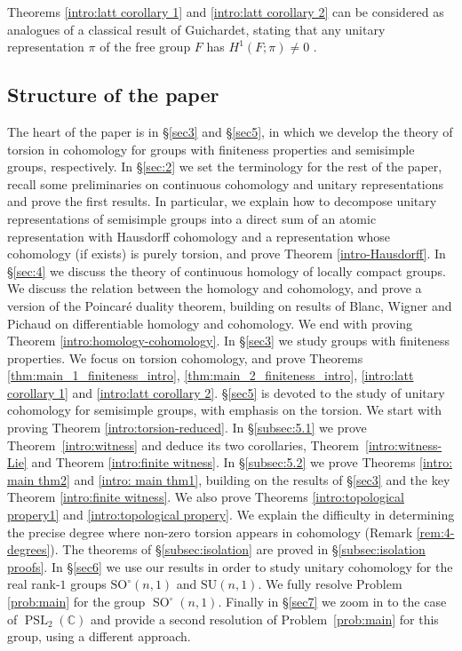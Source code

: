 \documentclass[12pt,reqno]{amsart}
\newcommand{\C}{\mathbb{C}}
\theoremstyle{definition}
\newcommand{\PSL}{\operatorname{PSL}}
\newcommand{\SO}{\operatorname{SO}}
\begin{document}
Theorems \ref{intro:latt corollary 1} and \ref{intro:latt corollary 2} can be considered as analogues of a classical result of Guichardet, stating that any unitary representation $\pi$ of the free group $F$ has $H^1(F;\pi) \neq 0$ \cite[Example~1]{Guichardet72}.



\subsection{Structure of the paper}
The heart of the paper is in \S\ref{sec3} and \S\ref{sec5}, in which we develop the theory of torsion in cohomology for groups with finiteness properties and semisimple groups, respectively. In \S\ref{sec:2} we set the terminology for the rest of the paper, recall some preliminaries on continuous cohomology and unitary representations and prove the first results. In particular, we explain how to decompose unitary representations of semisimple groups into a direct sum of an atomic representation with Hausdorff cohomology and a representation whose cohomology (if exists) is purely torsion, and prove Theorem \ref{intro-Hausdorff}. In \S\ref{sec:4} we discuss the theory of continuous homology of locally compact groups. We discuss the relation between the homology and cohomology, and prove a version of the Poincar\'e duality theorem, building on results of Blanc, Wigner and Pichaud on differentiable homology and cohomology. We end with proving Theorem \ref{intro:homology-cohomology}. In \S\ref{sec3} we study groups with finiteness properties. We focus on torsion cohomology, and prove Theorems \ref{thm:main_1_finiteness_intro}, \ref{thm:main_2_finiteness_intro}, \ref{intro:latt corollary 1} and \ref{intro:latt corollary 2}. \S\ref{sec5} is devoted to the study of unitary cohomology for semisimple groups, with emphasis on the torsion. We start with proving Theorem \ref{intro:torsion-reduced}.
In \S\ref{subsec:5.1} we prove Theorem~\ref{intro:witness} and deduce its two corollaries, Theorem~\ref{intro:witness-Lie}
and Theorem \ref{intro:finite witness}.
In \S\ref{subsec:5.2} we prove Theorems \ref{intro: main thm2} and \ref{intro: main thm1}, building on the results of \S\ref{sec3} and the key Theorem \ref{intro:finite witness}. We also prove Theorems \ref{intro:topological propery1} and \ref{intro:topological propery}. We explain the difficulty in determining the precise degree where non-zero torsion appears in cohomology (Remark \ref{rem:4-degrees}). 
The theorems of \S\ref{subsec:isolation} are proved in \S\ref{subsec:isolation proofs}.
In \S\ref{sec6} we use our results in order to study unitary cohomology for the real rank-$1$ groups $\mathrm{SO}^\circ(n,1)$ and $\mathrm{SU}(n,1)$. We fully resolve Problem \ref{prob:main} for the group $\SO^\circ(n,1)$. Finally in \S\ref{sec7} we zoom in to the case of $\PSL_2(\C)$ and provide a second resolution of Problem~\ref{prob:main} for this group, using a different approach.
\end{document}
